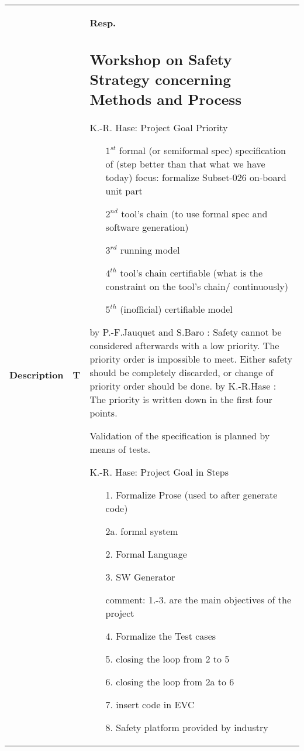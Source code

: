 \documentclass[a4paper]{article}
\newcommand{\A}[2]{\newline{\textbf{Answer}}
	\ifthenelse{\isempty{#1}}%
    	{}%
    	{by #1}%
    : #2}
\newcommand{\C}[2]{\newline{\textbf{Comment}}
	\ifthenelse{\isempty{#1}}%
    	{}%
    	{by #1}%
    : #2}
\begin{document}
\setlength{\extrarowheight}{1.5pt}
\begin{longtable}{|p{}|p{}|p{}|}
\hline
\textbf{Description} & \textbf{T} & \textbf{Resp.} 
\endhead
\hline
\setcounter{section}{2}
\setcounter{subsection}{0}
\subsection{Workshop on Safety Strategy concerning Methods and Process} %

K.-R. Hase: Project Goal Priority

\begin{itemize}
	\item [$1^{st}$] formal (or semiformal spec) specification of (step better than that what we have today) focus: formalize Subset-026 on-board unit part %
	\item [$2^{nd}$] tool's chain (to use formal spec and software generation) %
	\item [$3^{rd}$] running model %
	\item [$4^{th}$] tool's chain certifiable (what is the constraint on the tool's chain/ continuously) %
	\item [$5^{th}$] (inofficial) certifiable model
\end{itemize}

\C{P.-F.Jauquet and S.Baro}{Safety cannot be considered afterwards with a low priority. The priority order is impossible to meet. Either safety should be completely discarded, or change of priority order should be done.}
\A{K.-R.Hase}{The priority is written down in the first four points.}

Validation of the specification is planned by means of tests.

K.-R. Hase: Project Goal in Steps

\begin{itemize}
	\item [1.] Formalize Prose (used to after generate code)
	\item [2a.] formal system
	\item [2.] Formal Language
	\item [3.] SW Generator 
	\item [] comment: 1.-3. are the main objectives of the project
	\item [4.] Formalize the Test cases
	\item [5.] closing the loop from 2 to 5
	\item [6.] closing the loop from 2a to 6 
	\item [7.] insert code in EVC
	\item [8.] Safety platform provided by industry
\end{itemize}


\end{longtable}
\end{document}
